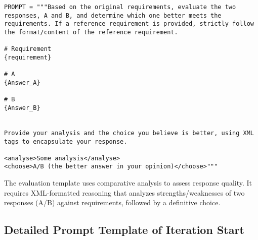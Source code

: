 \begin{tcolorbox}[title={\textbf{\small Evaluate Function's Prompt}}, boxrule=2pt, arc=0mm, breakable]\begin{verbatim}
PROMPT = """Based on the original requirements, evaluate the two responses, A and B, and determine which one better meets the requirements. If a reference requirement is provided, strictly follow the format/content of the reference requirement.

# Requirement
{requirement}

# A
{Answer_A}

# B
{Answer_B}


Provide your analysis and the choice you believe is better, using XML tags to encapsulate your response.

<analyse>Some analysis</analyse>
<choose>A/B (the better answer in your opinion)</choose>"""
\end{verbatim}
\end{tcolorbox}


The evaluation template uses comparative analysis to assess response quality. It requires XML-formatted reasoning that analyzes strengths/weaknesses of two responses (A/B) against requirements, followed by a definitive choice. 

\subsection{Detailed Prompt Template of Iteration Start}


